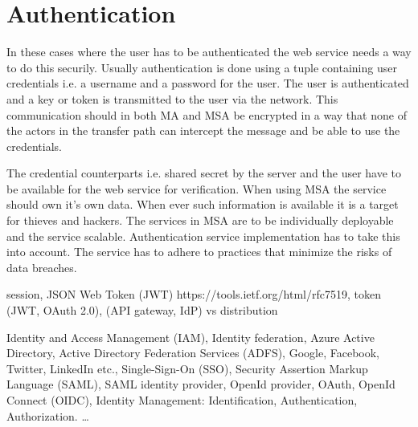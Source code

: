 \section{Authentication}
\begin{sloppypar}
    In these cases where the user has to be authenticated the web service needs 
    a way to do this securily. Usually authentication is done using a tuple 
    containing user credentials i.e. a username and a password for the user. The
    user is authenticated and a key or token is transmitted to the user via the 
    network. This communication should in both MA and MSA be encrypted in a way 
    that none of the actors in the transfer path can intercept the message and 
    be able to use the credentials.
\end{sloppypar}
\begin{sloppypar}
    The credential counterparts i.e. shared secret by the server and the user 
    have to be available for the web service for verification. When using MSA 
    the service should own it's own data. When ever such information is 
    available it is a target for thieves and hackers. The services in MSA are 
    to be individually deployable and the service scalable. Authentication 
    service implementation has to take this into account. The service has to 
    adhere to practices that minimize the risks of data breaches. 
\end{sloppypar}
\begin{sloppypar}
    session, 
    JSON Web Token (JWT) https://tools.ietf.org/html/rfc7519, 
    token (JWT, OAuth 2.0), 
    (API gateway, IdP) vs distribution 
\end{sloppypar}
\begin{sloppypar}
    Identity and Access Management (IAM),
    Identity federation, 
    Azure Active Directory,
    Active Directory Federation Services (ADFS),
    Google, Facebook, Twitter, LinkedIn etc.,
    Single-Sign-On (SSO),
    Security Assertion Markup Language (SAML),
    SAML identity provider,
    OpenId provider,
    OAuth,
    OpenId Connect (OIDC),
    Identity Management: Identification, Authentication, Authorization.
    \dots
\end{sloppypar}

